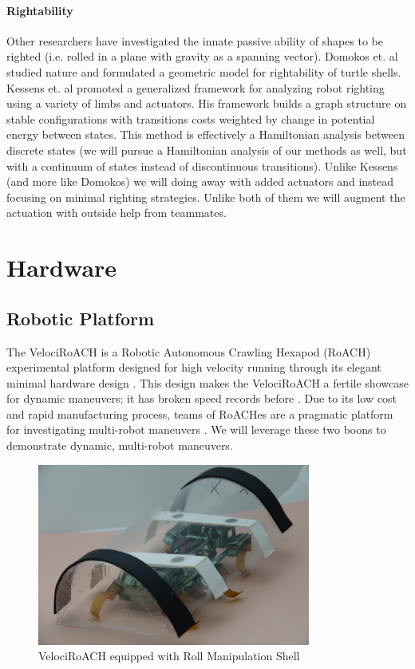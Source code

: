 \documentclass[letterpaper]{report}
\begin{document}
\subsubsection{Rightability}
Other researchers have investigated the innate passive ability of shapes to be righted (i.e. rolled in a plane with gravity as a spanning vector).
Domokos et. al \cite{domokos2008geometry} studied nature and formulated a geometric model for rightability of turtle shells.
Kessens et. al \cite{kessens2012framework,kessens2014metric} promoted a generalized framework for analyzing robot righting using a variety of limbs and actuators.
His framework builds a graph structure on stable configurations with transitions costs weighted by change in potential energy between states.
This method is effectively a Hamiltonian analysis between discrete states (we will pursue a Hamiltonian analysis of our methods as well, but with a continuum of states instead of discontinuous transitions).
Unlike Kessens (and more like Domokos) we will doing away with added actuators and instead focusing on minimal righting strategies.
Unlike both of them we will augment the actuation with outside help from teammates.

\chapter{Hardware}

\section{Robotic Platform}
The VelociRoACH is a Robotic Autonomous Crawling Hexapod (RoACH) experimental platform designed for high velocity running through its elegant minimal hardware design \cite{haldaneVelociRoACHDesign}.
This design makes the VelociRoACH a fertile showcase for dynamic maneuvers; it has broken speed records before \cite{haldane2015running}.
Due to its low cost and rapid manufacturing process, teams of RoACHes are a pragmatic platform for investigating multi-robot maneuvers \cite{casarez2016step}.
We will leverage these two boons to demonstrate dynamic, multi-robot maneuvers.

\begin{figure}[ht]
  \centering
  \includegraphics[width=0.8\textwidth]{ShellRoACH.jpg}
  \caption{\label{fig:ShellRoACH}VelociRoACH equipped with Roll Manipulation Shell}
\end{figure}
\end{document}
